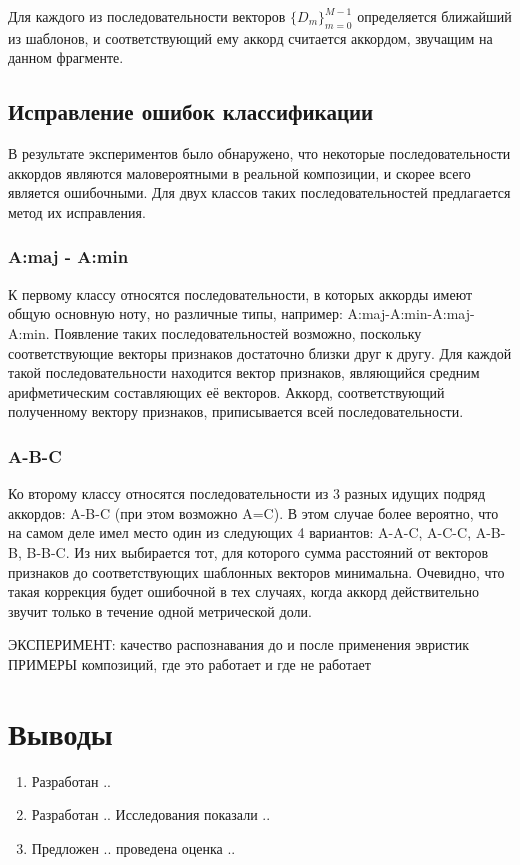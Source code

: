 Для каждого из последовательности векторов $\{D_m\}_{m=0}^{M-1}$ определяется
ближайший из шаблонов, и соответствующий ему аккорд считается аккордом, звучащим
на данном фрагменте.

\subsection{Исправление ошибок классификации} \label{ssect1_errcorr}

В результате экспериментов было обнаружено, что некоторые последовательности
аккордов являются маловероятными в реальной композиции, и скорее всего является
ошибочными. Для двух классов таких последовательностей предлагается метод их
исправления.

\subsubsection{A:maj - A:min}

К первому классу относятся последовательности, в которых аккорды имеют общую
основную ноту, но различные типы, например: A:maj-A:min-A:maj-A:min. Появление
таких последовательностей возможно, поскольку соответствующие векторы признаков
достаточно близки друг к другу. Для каждой такой последовательности находится
вектор признаков, являющийся средним арифметическим составляющих её векторов.
Аккорд, соответствующий полученному вектору признаков, приписывается всей
последовательности.

\subsubsection{A-B-C}

Ко второму классу относятся последовательности из 3 разных идущих подряд
аккордов: A-B-C (при этом возможно A=C). В этом случае более вероятно, что на
самом деле имел место один из следующих 4 вариантов: A-A-C, A-C-C, A-B-B,
B-B-C. Из них выбирается тот, для которого сумма расстояний от векторов
признаков до соответствующих шаблонных векторов минимальна. Очевидно, что такая
коррекция будет ошибочной в тех случаях, когда аккорд действительно звучит
только в течение одной метрической доли.

ЭКСПЕРИМЕНТ: качество распознавания до и после применения эвристик
ПРИМЕРЫ композиций, где это работает и где не работает

\section{Выводы}

\begin{enumerate}
  \item Разработан ..
  \item Разработан .. Исследования показали ..
  \item Предложен .. проведена оценка ..
\end{enumerate}


\clearpage